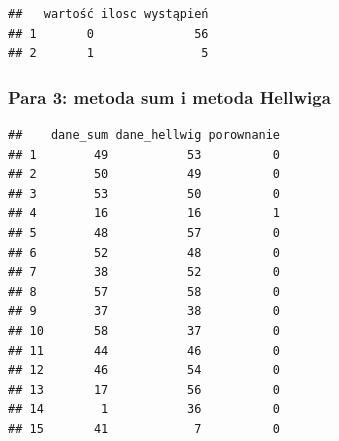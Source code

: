 \documentclass[12pt,a4paper]{report}
\begin{document}
{\begin{verbatim}
##   wartość ilosc wystąpień
## 1       0              56
## 2       1               5
\end{verbatim}

\subsubsection{Para 3: metoda sum i metoda
Hellwiga}%

\begin{Shaded}
\begin{Highlighting}[]
\NormalTok{(}\NormalTok{,}\NormalTok{)}

\NormalTok{:}
\NormalTok{\{}
  \NormalTok{\{}
  \NormalTok{\}}
\NormalTok{\}}
\NormalTok{)}
\end{Highlighting}
\end{Shaded}

\begin{verbatim}
##    dane_sum dane_hellwig porownanie
## 1        49           53          0
## 2        50           49          0
## 3        53           50          0
## 4        16           16          1
## 5        48           57          0
## 6        52           48          0
## 7        38           52          0
## 8        57           58          0
## 9        37           38          0
## 10       58           37          0
## 11       44           46          0
## 12       46           54          0
## 13       17           56          0
## 14        1           36          0
## 15       41            7          0
\end{verbatim}

\begin{Shaded}
\begin{Highlighting}[]
\NormalTok{(}
\NormalTok{(}\NormalTok{,}\NormalTok{)}
\end{Highlighting}
\end{Shaded}

}
\end{document}
